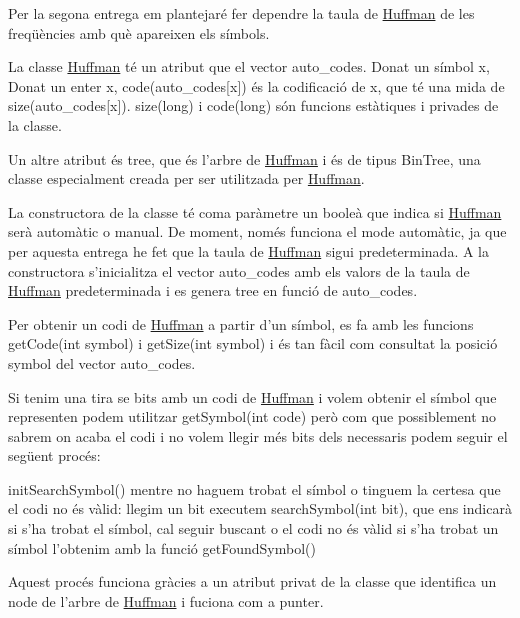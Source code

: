 Per la segona entrega em plantejaré fer dependre la taula de \hyperlink{classHuffman}{Huffman} de les freqüències amb què apareixen els símbols.

La classe \hyperlink{classHuffman}{Huffman} té un atribut que el vector auto\+\_\+codes. Donat un símbol x, Donat un enter x, code(auto\+\_\+codes\mbox{[}x\mbox{]}) és la codificació de x, que té una mida de size(auto\+\_\+codes\mbox{[}x\mbox{]}). size(long) i code(long) són funcions estàtiques i privades de la classe.

Un altre atribut és tree, que és l’arbre de \hyperlink{classHuffman}{Huffman} i és de tipus Bin\+Tree, una classe especialment creada per ser utilitzada per \hyperlink{classHuffman}{Huffman}.

La constructora de la classe té coma paràmetre un booleà que indica si \hyperlink{classHuffman}{Huffman} serà automàtic o manual. De moment, només funciona el mode automàtic, ja que per aquesta entrega he fet que la taula de \hyperlink{classHuffman}{Huffman} sigui predeterminada. A la constructora s’inicialitza el vector auto\+\_\+codes amb els valors de la taula de \hyperlink{classHuffman}{Huffman} predeterminada i es genera tree en funció de auto\+\_\+codes.

Per obtenir un codi de \hyperlink{classHuffman}{Huffman} a partir d’un símbol, es fa amb les funcions get\+Code(int symbol) i get\+Size(int symbol) i és tan fàcil com consultat la posició symbol del vector auto\+\_\+codes.

Si tenim una tira se bits amb un codi de \hyperlink{classHuffman}{Huffman} i volem obtenir el símbol que representen podem utilitzar get\+Symbol(int code) però com que possiblement no sabrem on acaba el codi i no volem llegir més bits dels necessaris podem seguir el següent procés\+:

init\+Search\+Symbol() mentre no haguem trobat el símbol o tinguem la certesa que el codi no és vàlid\+: llegim un bit executem search\+Symbol(int bit), que ens indicarà si s’ha trobat el símbol, cal seguir buscant o el codi no és vàlid si s’ha trobat un símbol l’obtenim amb la funció get\+Found\+Symbol()

Aquest procés funciona gràcies a un atribut privat de la classe que identifica un node de l’arbre de \hyperlink{classHuffman}{Huffman} i fuciona com a punter. 